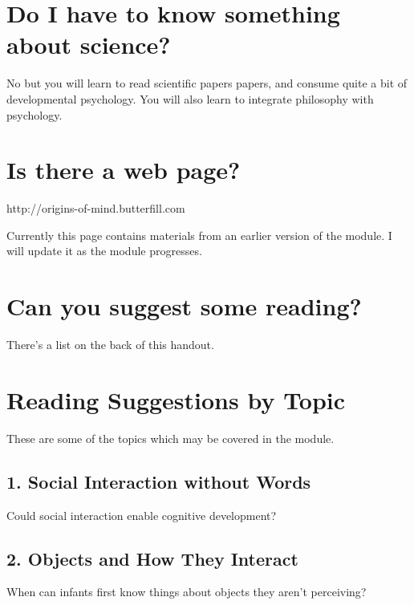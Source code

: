 \documentclass[12pt]{extarticle}
\begin{document}
\begin{multicols}{3}
\section{Do I have to know something about science?}
No but you will learn to read scientific papers papers, and consume quite a bit of developmental psychology.
You will also learn to integrate philosophy with psychology.





\section{Is there a web page?}
http://origins-of-mind.butterfill.com

Currently this page contains materials from an earlier version of the module.  I will update it as the module progresses.

\section{Can you suggest some reading?}
There’s a list on the back of this handout.

%



\section{Reading Suggestions by Topic}

These are some of the topics which may be covered in the module.

\subsection{1. Social Interaction without Words}
Could social interaction enable cognitive development? 
\citep{Moll:2007gu,
meltzoff:1977_imitation,
Csibra:2008be,
Baldwin:2000qq,
Liszkowski:2008al,
tomasello:2008origins}


\subsection{2. Objects and How They Interact}
\label{ch:objects}
When can infants first know things about objects they aren't perceiving?\citep{Meltzoff:1998wp,
baillargeon:1985_object,
Fodor:1983dg}




\end{multicols}
\end{document}
